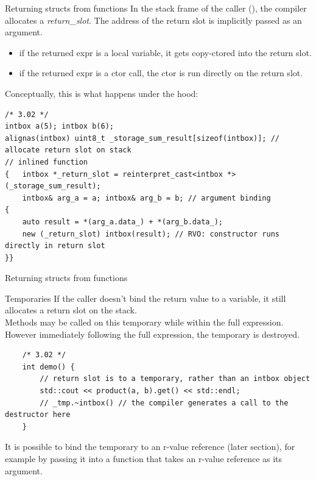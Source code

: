 \begin{frame}[fragile]{Returning structs from functions}
  In the stack frame of the caller (), the compiler allocates a \emph{return\_slot}.
  The address of the return slot is implicitly passed as an argument.
  \begin{itemize}
    \item if the returned expr is a local variable, it gets copy-ctored into the return slot.
    \item if the returned expr is a ctor call, the ctor is run directly on the return slot.
  \end{itemize}

  Conceptually, this is what happens under the hood:
  \begin{verbatim}
/* 3.02 */
intbox a(5); intbox b(6);
alignas(intbox) uint8_t _storage_sum_result[sizeof(intbox)]; // allocate return slot on stack
// inlined function
{   intbox *_return_slot = reinterpret_cast<intbox *>(_storage_sum_result);
    intbox& arg_a = a; intbox& arg_b = b; // argument binding
{
    auto result = *(arg_a.data_) + *(arg_b.data_);
    new (_return_slot) intbox(result); // RVO: constructor runs directly in return slot
}}
  \end{verbatim}
\end{frame}

\begin{frame}[fragile]{Returning structs from functions}
  
\end{frame}

\begin{frame}[fragile]{Temporaries}
  If the caller doesn't bind the return value to a variable,
  it still allocates a return slot on the stack.\\
  Methods may be called on this temporary while within the full expression.\\
  However immediately following the full expression, the temporary is destroyed.
  \begin{verbatim}
    /* 3.02 */
    int demo() {
        // return slot is to a temporary, rather than an intbox object
        std::cout << product(a, b).get() << std::endl;
        // _tmp.~intbox() // the compiler generates a call to the destructor here
    }
  \end{verbatim}

  It is possible to bind the temporary to an r-value reference (later section),
  for example by passing it into a function that takes an r-value reference as its argument.
\end{frame}

